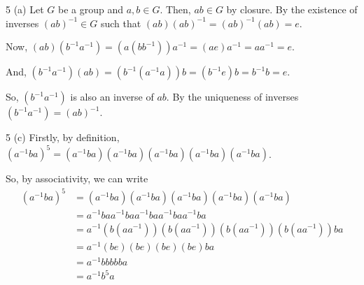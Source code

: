 \documentclass[11pt]{penrose}
\begin{document}
\begin{problem}{5 (a)}
    Let $G$ be a group and $a, b \in G$. Then, $ab \in G$ by closure. By the existence of inverses $(ab)^{-1} \in G$ such that $(ab) (ab)^{-1} = (ab)^{-1} (ab) = e$.

    Now, $(ab)(b^{-1}a^{-1}) = (a(bb^{-1}))a^{-1} = (ae)a^{-1} =aa^{-1} = e$.
    
    And, $(b^{-1}a^{-1})(ab) = (b^{-1}(a^{-1}a))b = (b^{-1}e)b =b^{-1}b = e$.

    So, $(b^{-1}a^{-1})$ is also an inverse of $ab$. By the uniqueness of inverses $(b^{-1}a^{-1}) = (ab)^{-1}$.
\end{problem}

\begin{problem}{5 (c)}
    Firstly, by definition, $(a^{-1} b a)^5 = (a^{-1} b a) (a^{-1} b a) (a^{-1} b a) (a^{-1} b a) (a^{-1} b a)$.

    So, by associativity, we can write
    \begin{align*}
        (a^{-1} b a)^5
        &= (a^{-1} b a) (a^{-1} b a) (a^{-1} b a) (a^{-1} b a) (a^{-1} b a)\\
        &= a^{-1} b a a^{-1} b a a^{-1} b a a^{-1} b a a^{-1} b a\\
        &= a^{-1} (b (a a^{-1})) (b (a a^{-1})) (b (a a^{-1})) (b (a a^{-1})) b a\\
        &= a^{-1} (b e) (b e) (b e) (b e) b a\\
        &= a^{-1} b b b b b a\\
        &= a^{-1} b^5 a
    \end{align*}
\end{problem}
\end{document}
